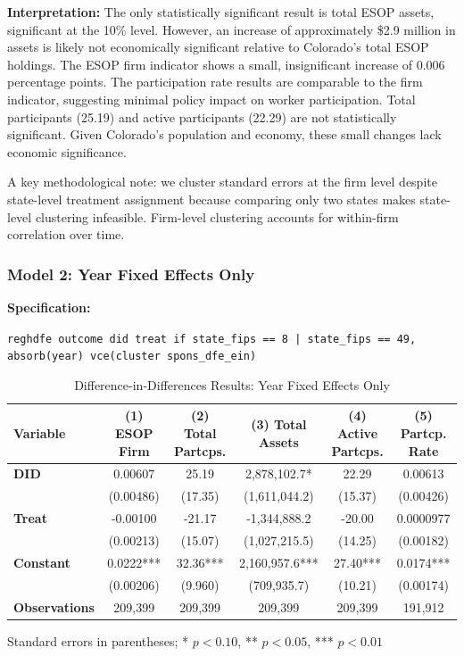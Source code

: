 \documentclass[12pt]{article}
\begin{document}
\textbf{Interpretation:} The only statistically significant result is total ESOP assets, significant at the 10\% level. However, an increase of approximately \$2.9 million in assets is likely not economically significant relative to Colorado's total ESOP holdings. The ESOP firm indicator shows a small, insignificant increase of 0.006 percentage points. The participation rate results are comparable to the firm indicator, suggesting minimal policy impact on worker participation. Total participants (25.19) and active participants (22.29) are not statistically significant. Given Colorado's population and economy, these small changes lack economic significance.

A key methodological note: we cluster standard errors at the firm level despite state-level treatment assignment because comparing only two states makes state-level clustering infeasible. Firm-level clustering accounts for within-firm correlation over time.

\subsubsection*{Model 2: Year Fixed Effects Only}

\textbf{Specification:}

\texttt{reghdfe outcome did treat if state\_fips == 8 | state\_fips == 49, \\ absorb(year) vce(cluster spons\_dfe\_ein)}

\begin{table}[H]
\centering
\caption{Difference-in-Differences Results: Year Fixed Effects Only}
\label{tab:model2}
\footnotesize
\begin{tabular}{lcccc|c}
\toprule
Variable & (1) ESOP Firm & (2) Total Partcps. & (3) Total Assets & (4) Active Partcps. & (5) Partcp. Rate \\
\midrule
\textbf{DID} & 0.00607 & 25.19 & 2,878,102.7* & 22.29 & 0.00613 \\
 & (0.00486) & (17.35) & (1,611,044.2) & (15.37) & (0.00426) \\
\textbf{Treat} & -0.00100 & -21.17 & -1,344,888.2 & -20.00 & 0.0000977 \\
 & (0.00213) & (15.07) & (1,027,215.5) & (14.25) & (0.00182) \\
\textbf{Constant} & 0.0222*** & 32.36*** & 2,160,957.6*** & 27.40*** & 0.0174*** \\
 & (0.00206) & (9.960) & (709,935.7) & (10.21) & (0.00174) \\
\midrule
\textbf{Observations} & 209,399 & 209,399 & 209,399 & 209,399 & 191,912 \\
\bottomrule
\end{tabular}

\vspace{0.5em}
{\footnotesize Standard errors in parentheses; * $p<0.10$, ** $p<0.05$, *** $p<0.01$}
\end{table}
\end{document}
